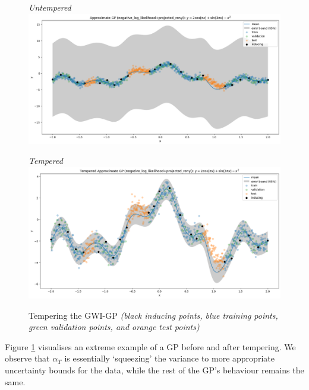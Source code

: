 \documentclass{article}
\numberwithin{equation}{section}
\begin{document}
\begin{figure}[h!]
\small
\centering
\begin{minipage}{.5\textwidth}
  \centering
  \textit{Untempered}
  \includegraphics[width=\linewidth, trim={0 0 0 0.84cm},clip]{thesis_report/figures/tempering/untempered.png}
\end{minipage}%
\begin{minipage}{.5\textwidth}
  \centering
  \textit{Tempered}
  \includegraphics[width=\linewidth, trim={0 0 0 0.85cm},clip]{thesis_report/figures/tempering/tempered.png}
\end{minipage}%
\caption{Tempering the GWI-GP \textit{(black inducing points, blue training points, green validation points, and orange test points)}}
\label{fig:tempered-gwi}
\end{figure}

Figure \ref{fig:tempered-gwi} visualises an extreme example of a GP before and after tempering. We observe that $\alpha_T$ is essentially `squeezing' the variance to more appropriate uncertainty bounds for the data, while the rest of the GP's behaviour remains the same.
\end{document}
